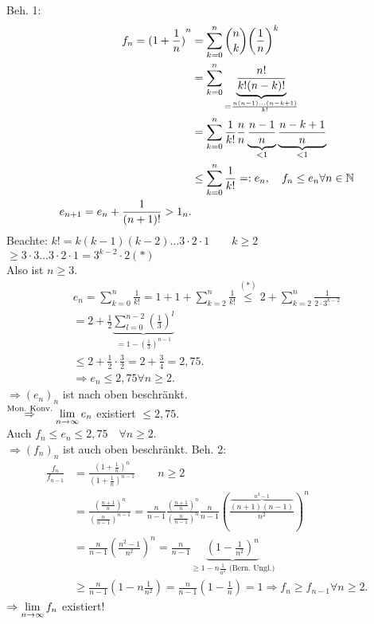 \documentclass[../ana1.tex]{subfiles}
\begin{document}
\begin{bew}
	Beh. 1:
	\begin{align*}
		f_n = {(1+\frac{1}{n})}^n  &= \sum_{k=0}^{n} \binom{n}{k} {\left( \frac{1}{n} \right)}^k\\
		&= \sum_{k=0}^{n} \underbrace{\frac{n!}{k!(n-k)!}}_{=\frac{n(n-1)\ldots (n-k+1)}{k!}} \\
		&= \sum_{k=0}^{n} \frac{1}{k!} \frac{n}{n} \underbrace{\frac{n-1}{n}}_{<1} \underbrace{\frac{n-k+1}{n}}_{<1}\\
		&\leq \sum_{k=0}^{n} \frac{1}{k!} =: e_n, \quad f_n \leq e_n \forall n\in\mathbb{N} \\
		e_{n+1} = e_n + \frac{1}{(n+1)!} > 1_n.
	\end{align*}
	Beachte: \( k! = k(k-1)(k-2)\ldots3\cdot2\cdot1 \qquad k\geq 2 \) \\
	\( \geq 3\cdot3\ldots3\cdot2\cdot1 = 3^{k-2}\cdot2 (*) \) \\
	Also ist \(n\geq3\).
	\begin{align*}
		e_n = \sum_{k=0}^{n} \frac{1}{k!} = 1+1 + \sum_{k=2}^{n} \frac{1}{k!} \overset{(*)}{\leq} 2 + \sum_{k=2}^{n} \frac{1}{2 \cdot 3^{k-2}}\\
		= 2 + \frac{1}{2} \underbrace{\sum_{l=0}^{n-2} {(\frac{1}{3})}^l}_{=1 - {(\frac{1}{3})}^{n-1}}\\
		\leq 2 + \frac{1}{2} \cdot \frac{3}{2} = 2 + \frac{3}{4} = 2,75.\\
		\Rightarrow e_n \leq 2,75 \forall n\geq 2.
	\end{align*}
	\(\Rightarrow {(e_n)}_n \) ist nach oben beschränkt.\\
	\( \overset{\text{Mon.\ Konv.}}{\Rightarrow} \lim\limits_{n\rightarrow\infty} e_n \) existiert \(\leq 2,75\).\\
	Auch \( f_n\leq e_n\leq 2,75 \quad \forall n\geq 2 \).\\
	\( \Rightarrow {(f_n)}_n \) ist auch oben beschränkt.
	Beh. 2:\\
	\begin{align*}
		\frac{f_n}{f_{n-1}} &= \frac{{(1+\frac{1}{n})}^n}{{(1+\frac{1}{n})}^{n-1}} \qquad n\geq 2\\
		&= \frac{{(\frac{n+1}{n})}^n}{{(\frac{n}{n-1})}^{n-1}} = \frac{n}{n-1} \frac{{(\frac{n+1}{n})}^n}{{(\frac{n}{n-1})}^{n}} \frac{n}{n-1} {\left( \frac{\overbrace{(n+1)(n-1)}^{n^2-1}}{n^2} \right)}^n\\
		&= \frac{n}{n-1} {\left( \frac{n^2-1}{n^2} \right)}^n = \frac{n}{n-1} \underbrace{{\left( 1-\frac{1}{n^2} \right)}^n}_{\geq 1-n \frac{1}{n^2} \text{ (Bern. Ungl.)}}\\
		&\geq \frac{n}{n-1} (1-n \frac{1}{n^2}) = \frac{n}{n-1} (1-\frac{1}{n}) = 1 \Rightarrow f_n \geq f_{n-1} \forall n\geq 2.
	\end{align*}
	\( \Rightarrow \lim\limits_{n\rightarrow\infty} f_n \) existiert!
\end{bew}
\end{document}
